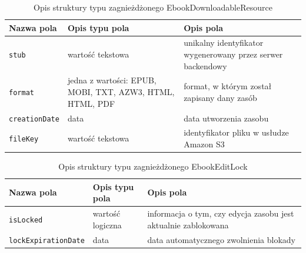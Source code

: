 \begin{table}
    \caption{Opis struktury typu zagnieżdżonego EbookDownloadableResource}
    \renewcommand{\arraystretch}{1.3} %
    \centering
    \begin{tabular}{|>{\centering\arraybackslash}m{4.7cm}|>{\centering\arraybackslash}m{4.7cm}|>{\centering\arraybackslash}m{4.7cm}|} \hline
        \textbf{Nazwa pola} & \textbf{Opis typu pola} & \textbf{Opis pola} \\ \hline
        \verb|stub| & wartość tekstowa & unikalny identyfikator wygenerowany przez serwer backendowy \\ \hline
        \verb|format| & jedna z wartości: EPUB, MOBI, TXT, AZW3, HTML, HTML, PDF & format, w którym został zapisany dany zasób \\ \hline
        \verb|creationDate| & data & data utworzenia zasobu  \\ \hline
        \verb|fileKey| & wartość tekstowa & identyfikator pliku w usłudze Amazon S3 \\ \hline
    \end{tabular}
    \label{tab:ebook_downloadable_resource_db_struct}
\end{table}

\begin{table}
    \caption{Opis struktury typu zagnieżdżonego EbookEditLock}
    \renewcommand{\arraystretch}{1.3} %
    \centering
    \begin{tabular}{|>{\centering\arraybackslash}m{4.7cm}|>{\centering\arraybackslash}m{4.7cm}|>{\centering\arraybackslash}m{4.7cm}|} \hline
        \textbf{Nazwa pola} & \textbf{Opis typu pola} & \textbf{Opis pola} \\ \hline
        \verb|isLocked| & wartość logiczna & informacja o tym, czy edycja zasobu jest aktualnie zablokowana \\ \hline
        \verb|lockExpirationDate| & data & data automatycznego zwolnienia blokady \\ \hline
    \end{tabular}
    \label{tab:ebook_edit_lock_db_struct}
\end{table}

